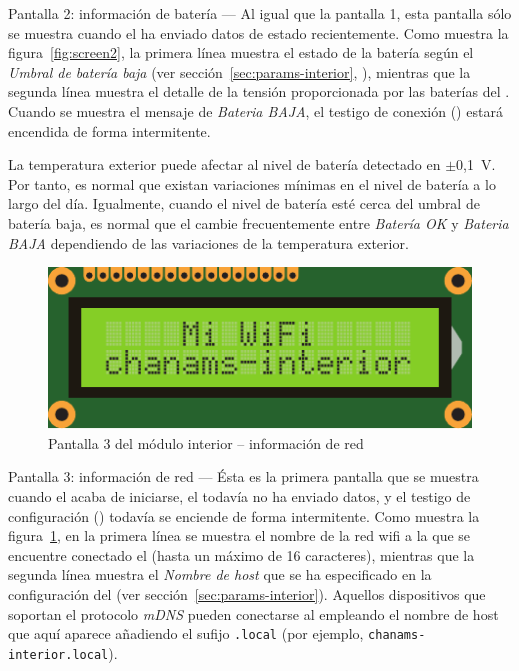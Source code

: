 \begin{descriptioncompact}
\item[Pantalla 2: información de batería] --- Al igual que la pantalla 1, esta pantalla sólo se muestra cuando el \MEE ha enviado datos de estado recientemente. Como muestra la figura~\ref{fig:screen2}, la primera línea muestra el estado de la batería según el \emph{Umbral de batería baja} (ver sección~\ref{sec:params-interior}, \textit{}), mientras que la segunda línea muestra el detalle de la tensión proporcionada por las baterías del \MEE. Cuando se muestra el mensaje de \emph{Bateria BAJA}, el testigo de conexión  () estará encendida de forma intermitente.

La temperatura exterior puede afectar al nivel de batería detectado en \mbox{$\pm$0,1 V}. Por tanto, es normal que existan variaciones mínimas en el nivel de batería a lo largo del día. Igualmente, cuando el nivel de batería esté cerca del umbral de batería baja, es normal que el \MIE cambie frecuentemente entre \emph{Batería OK} y \emph{Bateria BAJA} dependiendo de las variaciones de la temperatura exterior.
\attend

\begin{figure}
  \centering
  \includegraphics[width=0.6\columnwidth]{images/screen3}
  \caption{Pantalla 3 del módulo interior -- información de red}
  \label{fig:screen3}
\end{figure}


\item[Pantalla 3: información de red] --- Ésta es la primera pantalla que se muestra cuan\-do el \MIE acaba de iniciarse, el \MEE todavía no ha enviado datos, y el testigo de configuración  () todavía se enciende de forma intermitente. Como muestra la figura~\ref{fig:screen3}, en la primera línea se muestra el nombre de la red wifi a la que se encuentre conectado el \ME (hasta un máximo de 16 caracteres), mientras que la segunda línea muestra el \emph{Nombre de host} que se ha especificado en la configuración del \MI (ver sección~\ref{sec:params-interior}). Aquellos dispositivos que soportan el protocolo \emph{mDNS} pueden conectarse al \MI empleando el nombre de host que aquí aparece añadiendo el sufijo \texttt{.local} (por ejemplo, \texttt{chanams-interior.local}). 


\end{descriptioncompact}
